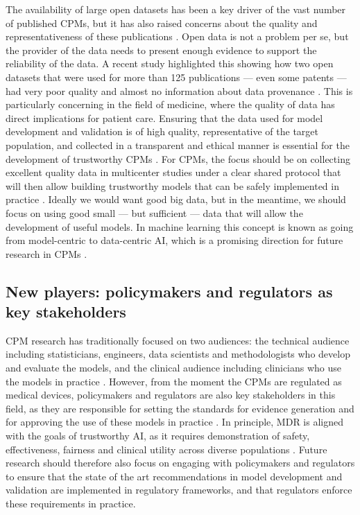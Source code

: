 The availability of large open datasets has been a key driver of the vast number of published \glspl{CPM}, but it has also raised concerns about the quality and representativeness of these publications \cite{SPICK2026112203}. Open data is not a problem per se, but the provider of the data needs to present enough evidence to support the reliability of the data. A recent study highlighted this showing how two open datasets that were used for more than 125 publications --- even some patents --- had very poor quality and almost no information about data provenance \cite{gibsonEvidenceUnreliableData2026}. This is particularly concerning in the field of medicine, where the quality of data has direct implications for patient care. Ensuring that the data used for model development and validation is of high quality, representative of the target population, and collected in a transparent and ethical manner is essential for the development of trustworthy \glspl{CPM} \cite{collinsTRIPODAIStatementUpdated2024}. For \glspl{CPM}, the focus should be on collecting excellent quality data in multicenter studies under a clear shared protocol that will then allow building trustworthy models that can be safely implemented in practice \cite{collinsTRIPODAIStatementUpdated2024,moonsPROBASTAIUpdatedQuality2025,steyerberg2019clinical}. Ideally we would want good big data, but in the meantime, we should focus on using good small --- but sufficient --- data that will allow the development of useful models. In machine learning this concept is known as going from model-centric to data-centric AI, which is a promising direction for future research in \glspl{CPM} \cite{jakubikDataCentricArtificialIntelligence2024}.

\subsection{New players: policymakers and regulators as key stakeholders}

\gls{CPM} research has traditionally focused on two audiences: the technical audience including statisticians, engineers, data scientists and methodologists who develop and evaluate the models, and the clinical audience including clinicians who use the models in practice \cite{efthimiou_developing_2024}. However, from the moment the \glspl{CPM} are regulated as medical devices, policymakers and regulators are also key stakeholders in this field, as they are responsible for setting the standards for evidence generation and for approving the use of these models in practice \cite{fraserArtificialIntelligenceMedical2023}. In principle, \gls{MDR} is aligned with the goals of trustworthy AI, as it requires demonstration of safety, effectiveness, fairness and clinical utility across diverse populations \cite{vancalsterPerformanceEvaluationPredictive2024, collinsTRIPODAIStatementUpdated2024}. Future research should therefore also focus on engaging with policymakers and regulators to ensure that the state of the art recommendations in model development and validation are implemented in regulatory frameworks, and that regulators enforce these requirements in practice.  


